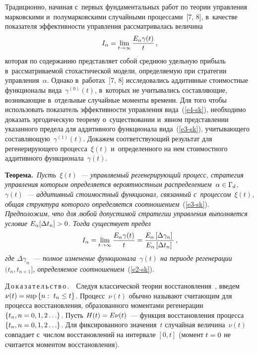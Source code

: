 \begin{multicols}{2}
  Традиционно, начиная с~первых фундаментальных работ по тео\-рии 
управления марковскими и~полумарковскими случайными процессами~[7, 8], 
в~качестве показателя эф\-фек\-тив\-ности управ\-ле\-ния рас\-смат\-ри\-ва\-лась величина
  \begin{equation}
  I_\alpha= \lim\limits_{t\to \infty} \displaystyle\frac{\displaystyle E_\alpha \gamma(t)\mathstrut}{\displaystyle t\mathstrut}\,,
  \label{e4-sk}
  \end{equation}
которая по содержанию пред\-став\-ля\-ет собой среднюю удельную прибыль 
в~рас\-смат\-ри\-ва\-емой стохастической модели, опре\-де\-ля\-емую при стратегии 
управ\-ле\-ния~$\alpha$. Однако в~работах~[7, 8] исследовались аддитивные 
стоимостные функционалы вида~$\gamma^{(0)} (t)$, в~которых не учитывались 
составляющие, воз\-ни\-ка\-ющие в~отдельные случайные моменты времени. Для 
того чтобы использовать показатель эффективности управ\-ле\-ния  
вида~(\ref{e4-sk}), необходимо доказать эргодическую тео\-ре\-му 
о~существовании и~явном пред\-став\-ле\-нии указанного предела для аддитивного 
функционала вида~(\ref{e3-sk}), учи\-ты\-ва\-юще\-го 
со\-став\-ля\-ющую~$\gamma^{(1)}(t)$. Докажем со\-от\-вет\-ст\-ву\-ющий результат для 
регенерирующего процесса~$\xi(t)$ и~определенного на нем стоимостного 
аддитивного функционала~$\gamma(t)$.

\smallskip

\noindent
  \textbf{Теорема.}\ \textit{Пусть~$\xi(t)$~--- управ\-ля\-емый регенерирующий 
процесс, стратегия управ\-ле\-ния которым определяется вероятностным 
распределением~$\alpha\hm\in \Gamma_d$, $\gamma(t)$~--- аддитивный 
стоимостный функционал, связанный с~процессом~$\xi(t)$, общая структура 
которого определяется соотношением}~(\ref{e3-sk}). \textit{Предположим, что 
для любой допустимой стратегии управ\-ле\-ния  выполняется условие $E_\alpha 
[\Delta t_n]\hm>0$. Тогда существует предел}
  \begin{equation}
  I_\alpha= \lim\limits_{t\to\infty} \displaystyle\frac{\displaystyle E_\alpha\gamma(t)\mathstrut}{\displaystyle t\mathstrut}=\displaystyle\frac{\displaystyle E_\alpha \left[ 
\Delta \gamma_n\right]\mathstrut}{\displaystyle E_\alpha \left[ \Delta t_n\right]\mathstrut}\,,
  \label{e5-sk}
  \end{equation}
\textit{где $\Delta\gamma_n$~--- полное изменение функционала~$\gamma(t)$ 
на периоде регенерации $(t_n, t_{n+1}]$, определяемое 
соотношением}~(\ref{e2-sk}).

\smallskip

  \noindent
  Д\,о\,к\,а\,з\,а\,т\,е\,л\,ь\,с\,т\,в\,о\,.\ \ Следуя классической тео\-рии 
восстановления~\cite{9-sk}, введем $\nu(t)\hm= \mathrm{sup} \left\{ n:\ t_n\hm\leq 
t\right\}$. Процесс~$\nu(t)$ обычно называют считающим для процесса 
восстановления, образованного моментами регенерации $\{ t_n, 
n\hm=0,1,2\ldots\}$. Пусть $H(t)\hm= E\nu(t)$~--- функция восстановления 
процесса $\{ t_n, n\hm=0,1,2\ldots\}$. Для фиксированного значения~$t$ 
случайная величина~$\nu(t)$ совпадает с~чис\-лом восстановлений на интервале 
$[0,t]$ (момент $t\hm=0$ не считается моментом восстановления).
  

\end{multicols}
